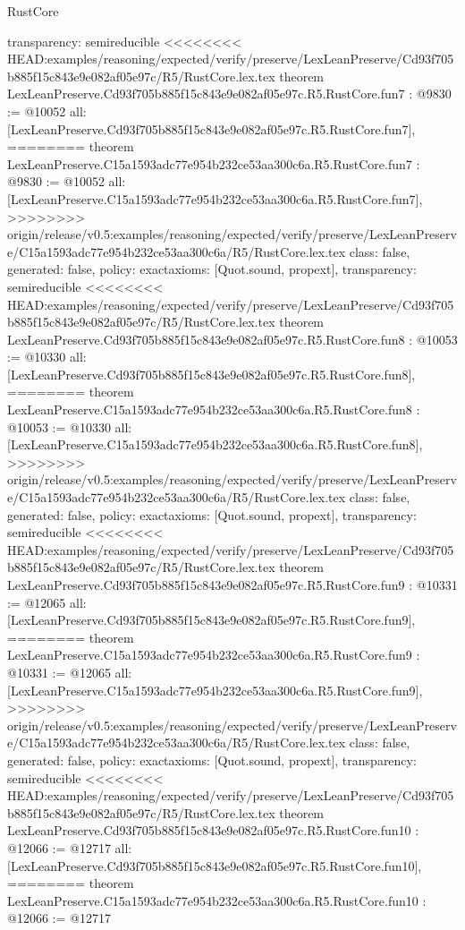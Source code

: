 \begin{lexlean}{RustCore}
\begin{coremodule}
{\begin{coremodule}
{{{{{{{{{{  transparency: semireducible
}
<<<<<<<< HEAD:examples/reasoning/expected/verify/preserve/LexLeanPreserve/Cd93f705b885f15c843e9e082af05e97c/R5/RustCore.lex.tex
theorem LexLeanPreserve.Cd93f705b885f15c843e9e082af05e97c.R5.RustCore.fun7 : @9830 := @10052 {
  all: [LexLeanPreserve.Cd93f705b885f15c843e9e082af05e97c.R5.RustCore.fun7],
========
theorem LexLeanPreserve.C15a1593adc77e954b232ce53aa300c6a.R5.RustCore.fun7 : @9830 := @10052 {
  all: [LexLeanPreserve.C15a1593adc77e954b232ce53aa300c6a.R5.RustCore.fun7],
>>>>>>>> origin/release/v0.5:examples/reasoning/expected/verify/preserve/LexLeanPreserve/C15a1593adc77e954b232ce53aa300c6a/R5/RustCore.lex.tex
  class: false,
  generated: false,
  policy: exact{axioms: [Quot.sound, propext]},
  transparency: semireducible
}
<<<<<<<< HEAD:examples/reasoning/expected/verify/preserve/LexLeanPreserve/Cd93f705b885f15c843e9e082af05e97c/R5/RustCore.lex.tex
theorem LexLeanPreserve.Cd93f705b885f15c843e9e082af05e97c.R5.RustCore.fun8 : @10053 := @10330 {
  all: [LexLeanPreserve.Cd93f705b885f15c843e9e082af05e97c.R5.RustCore.fun8],
========
theorem LexLeanPreserve.C15a1593adc77e954b232ce53aa300c6a.R5.RustCore.fun8 : @10053 := @10330 {
  all: [LexLeanPreserve.C15a1593adc77e954b232ce53aa300c6a.R5.RustCore.fun8],
>>>>>>>> origin/release/v0.5:examples/reasoning/expected/verify/preserve/LexLeanPreserve/C15a1593adc77e954b232ce53aa300c6a/R5/RustCore.lex.tex
  class: false,
  generated: false,
  policy: exact{axioms: [Quot.sound, propext]},
  transparency: semireducible
}
<<<<<<<< HEAD:examples/reasoning/expected/verify/preserve/LexLeanPreserve/Cd93f705b885f15c843e9e082af05e97c/R5/RustCore.lex.tex
theorem LexLeanPreserve.Cd93f705b885f15c843e9e082af05e97c.R5.RustCore.fun9 : @10331 := @12065 {
  all: [LexLeanPreserve.Cd93f705b885f15c843e9e082af05e97c.R5.RustCore.fun9],
========
theorem LexLeanPreserve.C15a1593adc77e954b232ce53aa300c6a.R5.RustCore.fun9 : @10331 := @12065 {
  all: [LexLeanPreserve.C15a1593adc77e954b232ce53aa300c6a.R5.RustCore.fun9],
>>>>>>>> origin/release/v0.5:examples/reasoning/expected/verify/preserve/LexLeanPreserve/C15a1593adc77e954b232ce53aa300c6a/R5/RustCore.lex.tex
  class: false,
  generated: false,
  policy: exact{axioms: [Quot.sound, propext]},
  transparency: semireducible
}
<<<<<<<< HEAD:examples/reasoning/expected/verify/preserve/LexLeanPreserve/Cd93f705b885f15c843e9e082af05e97c/R5/RustCore.lex.tex
theorem LexLeanPreserve.Cd93f705b885f15c843e9e082af05e97c.R5.RustCore.fun10 : @12066 := @12717 {
  all: [LexLeanPreserve.Cd93f705b885f15c843e9e082af05e97c.R5.RustCore.fun10],
========
theorem LexLeanPreserve.C15a1593adc77e954b232ce53aa300c6a.R5.RustCore.fun10 : @12066 := @12717 {
}}}}}}}}}}}}}}
\end{coremodule}}
\end{coremodule}
\end{lexlean}
